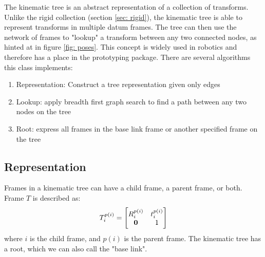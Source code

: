 The kinematic tree is an abstract representation of a collection of transforms. 
Unlike the rigid collection (section \ref{sec: rigid}), the kinematic tree is able to represent transforms in multiple datum frames. 
The tree can then use the network of frames to "lookup" a transform between any two connected nodes, as hinted at in figure \ref{fig: poses}.
This concept is widely used in robotics and therefore has a place in the prototyping package. 
There are several algorithms this class implements:
\begin{enumerate}
	\item Representation: Construct a tree representation given only edges
	\item Lookup: apply breadth first graph search to find a path between any two nodes on the tree
	\item Root: express all frames in the base link frame or another specified frame on the tree
\end{enumerate}

\subsection{Representation}
Frames in a kinematic tree can have a child frame, a parent frame, or both. 
Frame $T$ is described as:
\begin{equation}
	T_i^{p(i)} = \begin{bmatrix}
		R_i^{p(i)} & t_i^{p(i)} \\
		\bf{0} & 1
	\end{bmatrix}
\end{equation}
where $i$ is the child frame, and $p(i)$ is the parent frame. 
The kinematic tree has a root, which we can also call the "base link". 